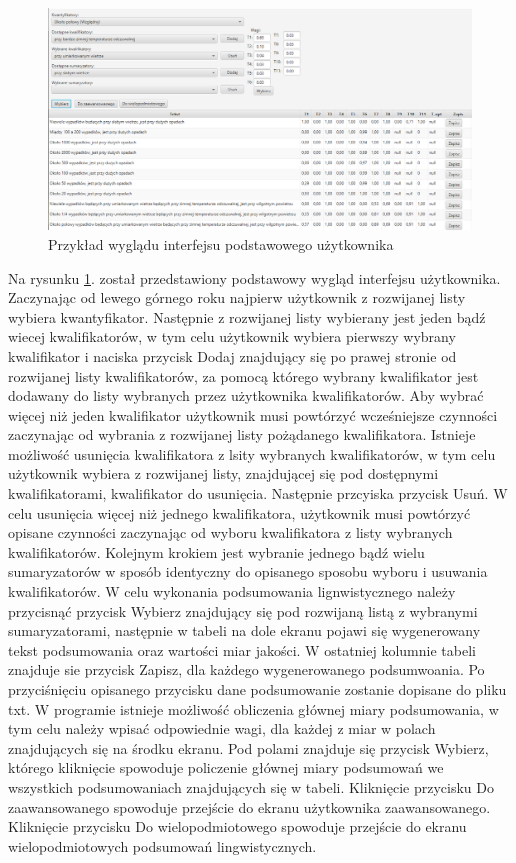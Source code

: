 \documentclass{classrep}
\begin{document}
\begin{figure}[h!]
 \centering
 \includegraphics[width=15cm]{gui.png}
 \vspace{-0.3cm}
 \caption{Przykład wyglądu interfejsu podstawowego użytkownika}
 \label{gui}
\end{figure}

Na rysunku \ref{gui}. został przedstawiony podstawowy wygląd interfejsu użytkownika. Zaczynając od lewego górnego roku najpierw użytkownik z rozwijanej listy wybiera kwantyfikator. Następnie z rozwijanej listy wybierany jest jeden bądź wiecej kwalifikatorów, w tym celu użytkownik wybiera pierwszy wybrany kwalifikator i naciska przycisk Dodaj znajdujący się po prawej stronie od rozwijanej listy kwalifikatorów, za pomocą którego wybrany kwalifikator jest dodawany do listy wybranych przez użytkownika kwalifikatorów. Aby wybrać więcej niż jeden kwalifikator użytkownik musi powtórzyć wcześniejsze czynności zaczynając od wybrania z rozwijanej listy pożądanego kwalifikatora. Istnieje możliwość usunięcia kwalifikatora z lsity wybranych kwalifikatorów, w tym celu użytkownik wybiera z rozwijanej listy, znajdującej się pod dostępnymi kwalifikatorami, kwalifikator do usunięcia. Następnie przcyiska przycisk Usuń. W celu usunięcia więcej niż jednego kwalifikatora, użytkownik musi powtórzyć opisane czynności zaczynając od wyboru kwalifikatora z listy wybranych kwalifikatorów. Kolejnym krokiem jest wybranie jednego bądź wielu sumaryzatorów w sposób identyczny do opisanego sposobu wyboru i usuwania kwalifikatorów. W celu wykonania podsumowania lignwistycznego należy przycisnąć przycisk Wybierz znajdujący się pod rozwijaną listą z wybranymi sumaryzatorami, następnie w tabeli na dole ekranu pojawi się wygenerowany tekst podsumowania oraz wartości miar jakości. W ostatniej kolumnie tabeli znajduje sie przycisk Zapisz, dla każdego wygenerowanego podsumwoania. Po przyciśnięciu opisanego przycisku dane podsumowanie zostanie dopisane do pliku txt. W programie istnieje możliwość obliczenia głównej miary podsumowania, w tym celu należy wpisać odpowiednie wagi, dla każdej z miar w polach znajdujących się na środku ekranu. Pod polami znajduje się przycisk Wybierz, którego kliknięcie spowoduje policzenie głównej miary podsumowań we wszystkich podsumowaniach znajdujących się w tabeli. Kliknięcie przycisku Do zaawansowanego spowoduje przejście do ekranu użytkownika zaawansowanego. Kliknięcie przycisku Do wielopodmiotowego spowoduje przejście do ekranu wielopodmiotowych podsumowań lingwistycznych. 
\end{document}

